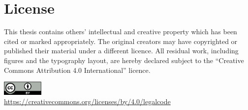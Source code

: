 \chapter{License}
\label{bm:license}

This thesis contains others' intellectual and creative property which has been cited or marked appropriately. The original creators may have copyrighted or published their material under a different licence. All residual work, including figures and the typography layout, are hereby declared subject to the \enquote{Creative Commons Attribution 4.0 International} licence.
\begin{center}
	\includegraphics[width=2cm]{logos/CCBY40}\\
	\url{https://creativecommons.org/licenses/by/4.0/legalcode}
\end{center} 
